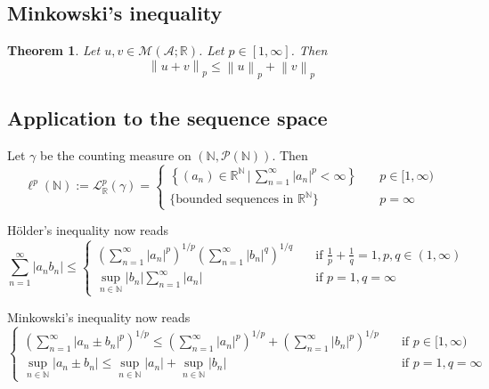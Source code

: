 \documentclass[11pt, a4paper, openany]{book}
\newtheorem{thm}{Theorem}\newtheorem{lem}{Lemma}\newtheorem{crl}{Corollary}
\theoremstyle{definition}
\begin{document}
\subsection{Minkowski's inequality}
        \begin{thm}
            Let $u,v\in\mathcal{M}(\mathscr{A};\mathbb{R})$. Let $p\in[1,\infty]$. Then
        \[\left\|u+v\right\|_p\leqslant \left\|u\right\|_p+\left\|v\right\|_p\]
        \end{thm}
\subsection{Application to the sequence space}
    Let $\gamma$ be the counting measure on $(\mathbb{N},\mathscr{P}(\mathbb{N}))$. Then
    \[
        \ell^p(\mathbb{N}):=\mathcal{L}_{\mathbb{R}}^p(\gamma)=\begin{cases}
            \left\{(a_n)\in\mathbb{R}^\mathbb{N}\,\big|\, \sum\limits_{n=1}^\infty |a_n|^p<\infty\right\}\quad &p\in[1,\infty)\\
            \{\text{bounded sequences in }\mathbb{R}^\mathbb{N}\}\quad &p=\infty
        \end{cases}
    \]
    \par H\"{o}lder's inequality now reads
    \[
        \sum_{n=1}^\infty |a_nb_n|\leqslant\begin{cases}
        \displaystyle\left(\sum_{n=1}^\infty|a_n|^p\right)^{1/p}\left(\sum_{n=1}^\infty|b_n|^q\right)^{1/q}\quad &\text{if }\displaystyle\frac{1}{p}+\frac{1}{q}=1, p,q\in(1,\infty)\\
        \displaystyle\sup_{n\in\mathbb{N}}|b_n|\sum_{n=1}^\infty|a_n|\quad &\text{if }p=1,q=\infty
    \end{cases}
    \]
    \par Minkowski's inequality now reads
    \[  
        \begin{cases}
        \displaystyle\left(\sum_{n=1}^\infty |a_n\pm b_n|^p\right)^{1/p}\leqslant\left(\sum_{n=1}^\infty |a_n|^p\right)^{1/p}+\left(\sum_{n=1}^\infty |b_n|^p\right)^{1/p}\quad &\text{if }p\in[1,\infty)\\
        \displaystyle\sup_{n\in\mathbb{N}}|a_n\pm b_n|\leqslant\sup_{n\in\mathbb{N}}|a_n|+\sup_{n\in\mathbb{N}}|b_n|\quad &\text{if }p=1,q=\infty
        \end{cases}
    \]
\end{document}
